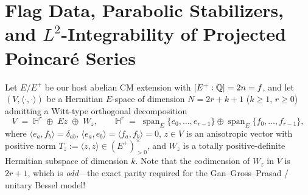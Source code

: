 \section{Flag Data, Parabolic Stabilizers, and $L^2$-Integrability of Projected Poincar\'e Series}
\label{sec:15:poincare-l2}

Let $E / E^+$ be our host abelian CM extension with $[E^+ : \mathbb{Q}] = 2n = f$, and let $(V, \langle \cdot, \cdot \rangle)$ be a Hermitian $E$-space of dimension $N = 2r + k + 1$ ($k \ge 1$, $r \ge 0$) admitting a Witt-type orthogonal decomposition
\begin{equation}
\label{eq:15:bessel-decomp}
  V \;=\; \mathbb{H}^r \;\oplus\; E z \;\oplus\; W_z,
  \qquad \mathbb{H}^r \;=\; \operatorname{span}_E\{e_0, \dots, e_{r-1}\} \oplus \operatorname{span}_E\{f_0, \dots, f_{r-1}\},
\end{equation}
where $\langle e_a, f_b \rangle = \delta_{ab}$, $\langle e_a, e_b \rangle = \langle f_a, f_b \rangle = 0$, $z \in V$ is an anisotropic vector with positive norm $T_z := \langle z, z \rangle \in (E^+)^\times_{>0}$, and $W_z$ is a totally positive-definite Hermitian subspace of dimension $k$. Note that the codimension of $W_z$ in $V$ is $2r + 1$, which is \emph{odd}—the exact parity required for the Gan--Gross--Prasad / unitary Bessel model!

